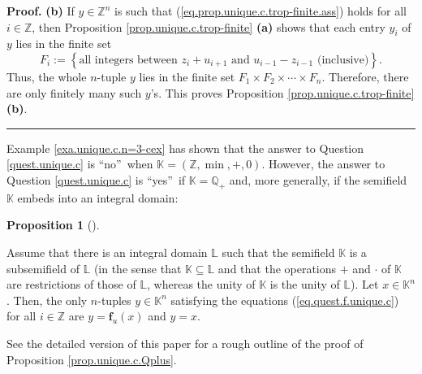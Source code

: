 \documentclass[numbers=enddot,12pt,final,onecolumn,notitlepage]{scrartcl}%
\theoremstyle{definition}
\newtheorem{prop}[theo]{Proposition}
\newenvironment{proposition}[1][]
{\begin{prop}[#1]\begin{leftbar}}
{\end{leftbar}\end{prop}}
\newenvironment{proof}[1][Proof]{\noindent\textbf{#1.} }{\ \rule{0.5em}{0.5em}}
\newenvironment{verlong}{}{}
\newenvironment{vershort}{}{}
\begin{document}
\begin{verlong}
\begin{proof}
\textbf{(b)} If $y\in\mathbb{Z}^{n}$ is such that
(\ref{eq.prop.unique.c.trop-finite.ass}) holds for all $i\in\mathbb{Z}$, then
Proposition \ref{prop.unique.c.trop-finite} \textbf{(a)} shows that each entry
$y_{i}$ of $y$ lies in the finite set
\[
F_{i}:=\left\{  \text{all integers between }z_{i}+u_{i+1}\text{ and }%
u_{i-1}-z_{i-1}\text{ (inclusive)}\right\}  .
\]
Thus, the whole $n$-tuple $y$ lies in the finite set $F_{1}\times F_{2}%
\times\cdots\times F_{n}$. Therefore, there are only finitely many such $y$'s.
This proves Proposition \ref{prop.unique.c.trop-finite} \textbf{(b)}.
\end{proof}
\end{verlong}

Example \ref{exa.unique.c.n=3-cex} has shown that the answer to Question
\ref{quest.unique.c} is \textquotedblleft no\textquotedblright\ when
$\mathbb{K}=\left(  \mathbb{Z},\min,+,0\right)  $. However, the answer to
Question \ref{quest.unique.c} is \textquotedblleft yes\textquotedblright\ if
$\mathbb{K}=\mathbb{Q}_{+}$ and, more generally, if the semifield $\mathbb{K}$
embeds into an integral domain:

\begin{proposition}
\label{prop.unique.c.Qplus}Assume that there is an integral domain
$\mathbb{L}$ such that the semifield $\mathbb{K}$ is a subsemifield of
$\mathbb{L}$ (in the sense that $\mathbb{K}\subseteq\mathbb{L}$ and that the
operations $+$ and $\cdot$ of $\mathbb{K}$ are restrictions of those of
$\mathbb{L}$, whereas the unity of $\mathbb{K}$ is the unity of $\mathbb{L}$).
Let $x\in\mathbb{K}^{n}$. Then, the only $n$-tuples $y\in\mathbb{K}^{n}$
satisfying the equations (\ref{eq.quest.f.unique.c}) for all $i\in\mathbb{Z}$
are $y=\mathbf{f}_{u}\left(  x\right)  $ and $y=x$.
\end{proposition}

\begin{vershort}
See the detailed version \cite{verlong} of this paper for a rough outline of
the proof of Proposition \ref{prop.unique.c.Qplus}.
\end{vershort}
\end{document}
